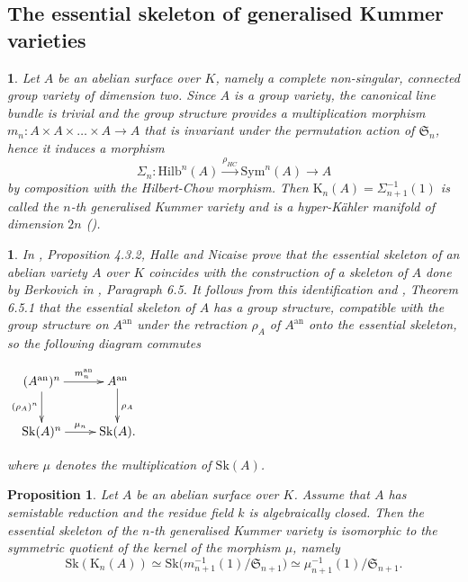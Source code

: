 \documentclass{amsart}%
\numberwithin{equation}{subsection}
\theoremstyle{plain2}
\newtheorem{prop}[equation]{Proposition}
\theoremstyle{definition2}
\theoremstyle{stepstyle}
\theoremstyle{point}
\theoremstyle{subpoint}
\newtheorem{subpoint}[equation]{}%
\newcommand{\spa}[1]{\begin{subpoint}#1\end{subpoint}}           %
\newcommand{\Hilb}{\ensuremath{\mathrm{Hilb}}}
\newcommand{\an}{\mathrm{an}}
\newcommand{\Sk}{\mathrm{Sk}}
\begin{document}
\subsection{The essential skeleton of generalised Kummer varieties} \label{sect essential sk Kummer}
\spa{Let $A$ be an abelian surface over $K$, namely a complete non-singular, connected group variety of dimension two. Since $A$ is a group variety, the canonical line bundle is trivial and the group structure provides a multiplication morphism $m_n: A \times A \times \ldots \times A \rightarrow A$ that is invariant under the permutation action of $\mathfrak{S}_n$, hence it induces a morphism $$\Sigma_n: \Hilb^n(A) \xrightarrow{\rho_{HC}} \text{Sym}^n(A) \rightarrow A$$ by composition with the Hilbert-Chow morphism. Then $\text{K}_n(A) = \Sigma_{n+1}^{-1}(1)$ is called the $n$-th generalised Kummer variety and is a hyper-K\"{a}hler manifold of dimension $2n$ (\cite{Beauville1983}).
}
\spa{In \cite{HalvardHalleNicaise2017}, Proposition 4.3.2, Halle and Nicaise prove that the essential skeleton of an abelian variety $A$ over $K$ coincides with the construction of a skeleton of $A$ done by Berkovich in \cite{Berkovich1990}, Paragraph 6.5. It follows from this identification and \cite{Berkovich1990}, Theorem 6.5.1 that the essential skeleton of $A$ has a group structure, compatible with the group structure on $A^\an$ under the retraction $\rho_A$ of $A^\an$ onto the essential skeleton, so the following diagram commutes
\begin{center}
$\xymatrix{
(A^\an)^n \ar[d]_{(\rho_A)^n} \ar[r]^-{m_n^\an} & A^\an \ar[d]^{\rho_A} \\
\Sk(A)^n \ar[r]^-{\mu_n} & \Sk(A).
}$
\end{center} where $\mu$ denotes the multiplication of $\Sk(A)$.
}
\begin{prop} \label{prop essential skeleton Kummer}
Let $A$ be an abelian surface over $K$. Assume that $A$ has  semistable reduction and the residue field $k$ is algebraically closed. Then the essential skeleton of the $n$-th generalised Kummer variety is isomorphic to the symmetric quotient of the kernel of the morphism $\mu$, namely $$\Sk(\text{K}_n(A)) \simeq \Sk\big(m_{n+1}^{-1}(1)/\mathfrak{S}_{n+1}\big) \simeq \mu_{n+1}^{-1}(1)/\mathfrak{S}_{n+1}.$$ 
\end{prop}
\end{document}

